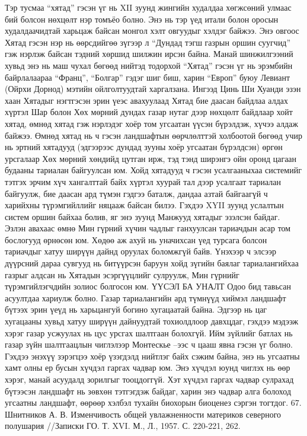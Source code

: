Тэр тусмаа “хятад” гэсэн үг нь XII зуунд жингийн худалдаа хөгжсөний улмаас бий болсон нөхцөлт нэр томъёо болно. Энэ нь тэр үед итали болон оросын худалдаачидтай харьцаж байсан монгол хэлт овгуудыг хэлдэг байжээ. Энэ овгоос Хятад гэсэн нэр нь өөрсдийгөө зүгээр л “Дундад тэгш газрын оршин суугчид” гэж нэрлэж байсан тэдний хөршид шилжин ирсэн байна. Манай шинжилгээний хувьд энэ нь маш чухал бөгөөд нийтэд тодорхой “Хятад” гэсэн үг нь эрэмбийн байрлалаараа “Франц”, “Болгар” гэдэг шиг биш, харин “Европ” буюу Левиант (Ойрхи Дорнод) мэтийн ойлголтуудтай харгалзана. Ингээд Цинь Ши Хуанди эзэн хаан Хятадыг нэгтгэсэн эрин үеэс авахуулаад Хятад бие даасан байдлаа алдах хүртэл Шар болон Хөх мөрний дундах газар нутаг дээр нөхцөлт байдлаар хойт хятад, өмнөд хятад гэж нэрлэдэг хоёр том угсаатан үүсэн бүрэлдэж, хүчээ алдаж байжээ. Өмнөд хятад нь ч гэсэн ландшафтын өөрчлөлттэй холбоотой бөгөөд учир нь эртний хятадууд (эдгээрээс дундад зууны хоёр угсаатан бүрэлдсэн) өргөн урсгалаар Хөх мөрний хөндийд цутган ирж, тэд тэнд ширэнгэ ойн оронд цагаан будааны тариалан байгуулсан юм. Хойд хятадууд ч гэсэн усалгааныхаа системийг тэтгэх эрчим хүч хангалттай байх хүртэл хуурай тал дээр усалгаат тариалан байгуулж, бие даасан ард түмэн гэдгээ баталж, дандаа азтай байгаагүй ч харийхны түрэмгийллийг няцааж байсан билээ. Гэхдээ XYII зуунд услалтын систем оршин байхаа болив, яг энэ зуунд Манжууд хятадыг эзэлсэн байдаг. Эзлэн авахаас өмнө Мин гүрний хүчин чадлыг ганхуулсан тариачдын асар том бослогууд өрнөсөн юм. Хөдөө аж ахуй нь уначихсан үед турсага болсон тариачдыг хатуу ширүүн дайнд оруулах боломжгүй байв. Үнэхээр ч элсээр дүүрсний дараа сувгууд нь битүүрсэн баруун хойд зүгийн баялаг тариалангийхаа газрыг алдсан нь Хятадын эсэргүүцлийг сулруулж, Мин гүрнийг түрэмгийлэгчдийн золиос болгосон юм.
ҮҮСЭЛ БА УНАЛТ
Одоо бид тавьсан асуултдаа хариулж болно. Газар тариалангийн ард түмнүүд хиймэл ландшафт бүтээх эрин үеүд нь харьцангуй богино хугацаатай байна. Эдгээр нь цаг хугацааны хувьд хатуу ширүүн дайнуудтай тохиолдлоор давхцдаг, гэхдээ мэдээж хэрэг газар усжуулах нь цус урсгах шалтгаан болохгүй. Ийм зүйлийг батлах нь газар зүйн шалтгаацлын чиглэлээр Монтескье –ээс ч цааш явна гэсэн үг болно. Гэхдээ энэхүү зэрэгцээ хоёр үзэгдэлд нийтлэг байх сэжим байна, энэ нь угсаатны хамт олны ер бусын хүчдэл гаргах чадвар юм. Энэ хүчдэл юунд чиглэх нь өөр хэрэг, манай асуудалд зорилгыг тооцдоггүй. Хэт хүчдэл гаргах чадвар сулрахад бүтээсэн ландшафт нь зөвхөн тэтгэгдэж байдаг, харин энэ чадвар алга болоход угсаатны ландшафт, өөрөөр хэлбэл тухайн биохорын биоценез сэргэн тогтдог. 67. Шнитников А. В. Изменчивость общей увлажненности материков северного полушария //Записки ГО. Т. XVI. М., Л., 1957. С. 220-221, 262.
